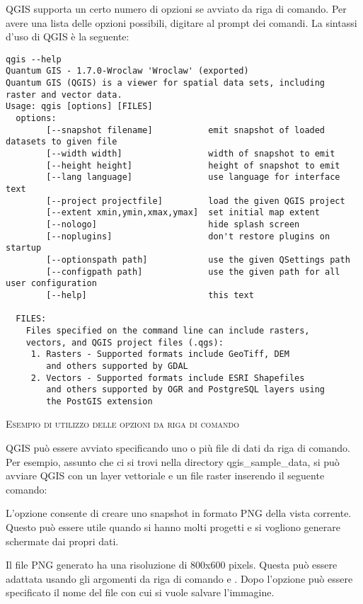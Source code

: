 \nix QGIS supporta un certo numero di opzioni se avviato da riga di comando.
Per avere una lista delle opzioni possibili, digitare  al prompt dei comandi.
La sintassi d'uso di QGIS è la seguente:

\small
\begin{verbatim}
qgis --help
Quantum GIS - 1.7.0-Wroclaw 'Wroclaw' (exported)
Quantum GIS (QGIS) is a viewer for spatial data sets, including
raster and vector data.
Usage: qgis [options] [FILES]
  options:
        [--snapshot filename]           emit snapshot of loaded datasets to given file
        [--width width]                 width of snapshot to emit
        [--height height]               height of snapshot to emit
        [--lang language]               use language for interface text
        [--project projectfile]         load the given QGIS project
        [--extent xmin,ymin,xmax,ymax]  set initial map extent
        [--nologo]                      hide splash screen
        [--noplugins]                   don't restore plugins on startup
        [--optionspath path]            use the given QSettings path
        [--configpath path]             use the given path for all user configuration
        [--help]                        this text

  FILES:
    Files specified on the command line can include rasters,
    vectors, and QGIS project files (.qgs):
     1. Rasters - Supported formats include GeoTiff, DEM
        and others supported by GDAL
     2. Vectors - Supported formats include ESRI Shapefiles
        and others supported by OGR and PostgreSQL layers using
        the PostGIS extension
\end{verbatim}
\normalsize

\begin{Tip} \caption{\textsc{Esempio di utilizzo delle opzioni da riga di comando}}
QGIS può essere avviato specificando uno o più file di dati da riga di comando.
Per esempio, assunto che ci si trovi nella directory 
qgis\_sample\_data, si può avviare QGIS con un layer vettoriale e un file raster inserendo il seguente comando:
\end{Tip}

L'opzione consente di creare uno snapshot in formato PNG della vista corrente.
Questo può essere utile quando si hanno molti progetti e si vogliono
generare schermate dai propri dati.

Il file PNG generato ha una risoluzione di 800x600 pixels. Questa può essere adattata
usando gli argomenti da riga di comando  e . 
Dopo l'opzione  può essere specificato il nome del file con cui si vuole salvare l'immagine.

